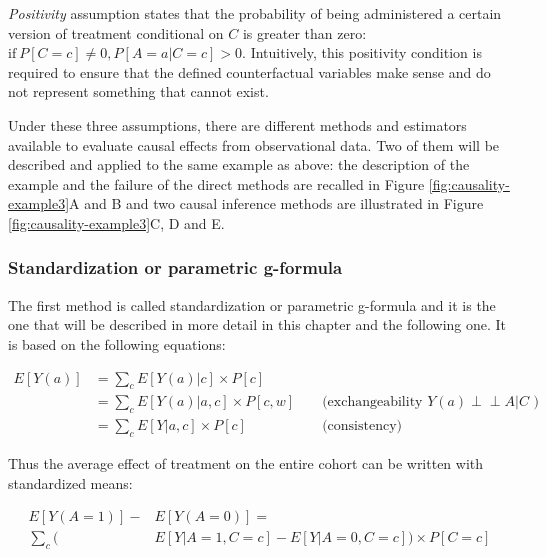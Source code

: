 \documentclass[a4paper,12pt,twoside,onecolumn,openright,final,oldfontcommands]{memoir}
\begin{document}
\emph{Positivity} assumption states that the probability of being
administered a certain version of treatment conditional on \(C\) is
greater than zero: \(\textrm{if} \: P[C=c] \neq 0, P[A=a | C=c] >0.\)
Intuitively, this positivity condition is required to ensure that the
defined counterfactual variables make sense and do not represent
something that cannot exist.

Under these three assumptions, there are different methods and
estimators available to evaluate causal effects from observational data.
Two of them will be described and applied to the same example as above:
the description of the example and the failure of the direct methods are
recalled in Figure \ref{fig:causality-example3}A and B and two causal
inference methods are illustrated in Figure
\ref{fig:causality-example3}C, D and E.

\subsubsection{Standardization or parametric
g-formula}\label{std-classic}

The first method is called standardization or parametric g-formula and
it is the one that will be described in more detail in this chapter and
the following one. It is based on the following equations:

\begin{equation*}
\begin{aligned}
  E[Y(a)] & = \sum_{c} E[Y(a)|c] \times P[c] \\
          & = \sum_{c} E[Y(a)|a,c] \times P[c,w]
          &&\text{ (exchangeability } Y(a) \perp \!\!\! \perp A | C \text{ )} \\
          & = \sum_{c} E[Y|a,c] \times P[c]
          &&\text{ (consistency)}
\end{aligned}
\end{equation*}

Thus the average effect of treatment on the entire cohort can be written
with standardized means:

\begin{equation}
\begin{aligned}
  E[Y(A=1)] - & E[Y(A=0)] = \\ 
   \sum_{c} \Big( & E[Y | A=1, C=c]-E[Y | A=0, C=c]\Big) \times P[C=c]
\end{aligned}
\end{equation}
\end{document}

